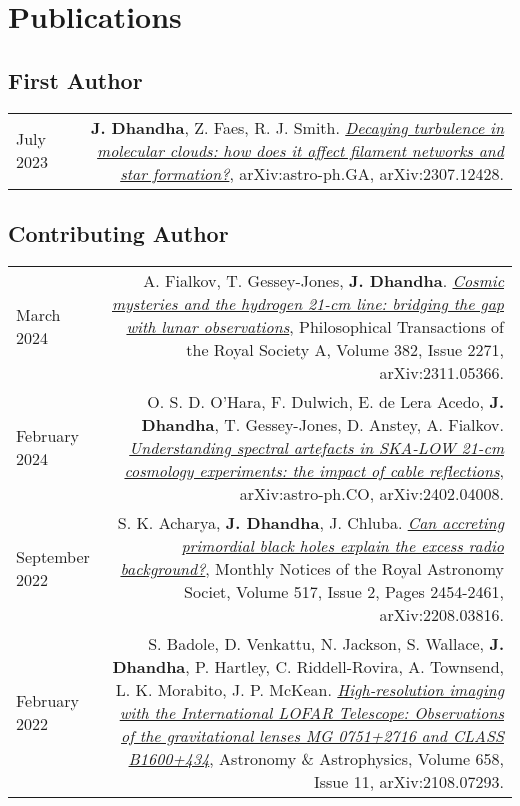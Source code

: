 \documentclass{article}
\begin{document}
\section*{Publications}

\subsection*{First Author}

\begin{tabular}{L!{\vrule}R}

    July 2023 & \textbf{J. Dhandha}, Z. Faes, R. J. Smith. \href{https://arxiv.org/abs/2307.12428}{\textit{Decaying turbulence in molecular clouds: how does it affect filament networks and star formation?}}, arXiv:astro-ph.GA, arXiv:2307.12428. \\

\end{tabular}

\subsection*{Contributing Author}

\begin{tabular}{L!{\vrule}R}

    March 2024 & A. Fialkov, T. Gessey-Jones, \textbf{J. Dhandha}. \href{https://doi.org/10.1098/rsta.2023.0068}{\textit{Cosmic mysteries and the hydrogen 21-cm line: bridging the gap with lunar observations}}, Philosophical Transactions of the Royal Society A, Volume 382, Issue 2271, arXiv:2311.05366. \\

    February 2024 & O. S. D. O'Hara, F. Dulwich, E. de Lera Acedo, \textbf{J. Dhandha}, T. Gessey-Jones, D. Anstey, A. Fialkov. \href{https://arxiv.org/abs/2402.04008}{\textit{Understanding spectral artefacts in SKA-LOW 21-cm cosmology experiments: the impact of cable reflections}}, arXiv:astro-ph.CO, arXiv:2402.04008. \\

	  September 2022 & S. K. Acharya, \textbf{J. Dhandha}, J. Chluba. \href{https://doi.org/10.1093/mnras/stac2739}{\textit{Can accreting primordial black holes explain the excess radio background?}}, Monthly Notices of the Royal Astronomy Societ, Volume 517, Issue 2, Pages 2454-2461, arXiv:2208.03816. \\

	  February 2022 & S. Badole, D. Venkattu, N. Jackson, S. Wallace, \textbf{J. Dhandha}, P. Hartley, C. Riddell-Rovira, A. Townsend, L. K. Morabito, J. P. McKean. \href{https://doi.org/10.1051/0004-6361/202141227}{\textit{High-resolution imaging with the International LOFAR Telescope: Observations of the gravitational lenses MG 0751+2716 and CLASS B1600+434}}, Astronomy \& Astrophysics, Volume 658, Issue 11, arXiv:2108.07293. \\

\end{tabular}
\end{document}
